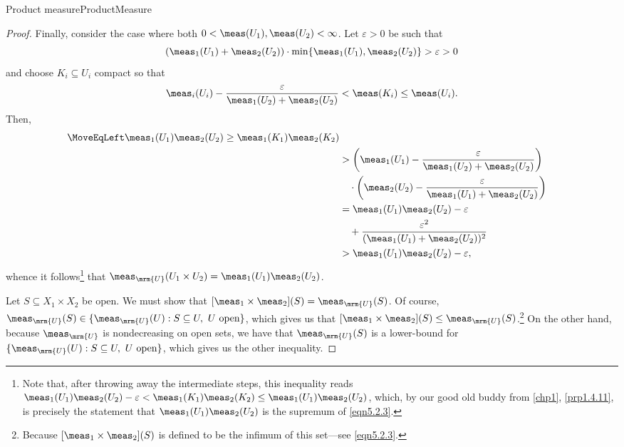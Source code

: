 \begin{thm}{Product measure}{ProductMeasure}
\begin{proof}
Finally, consider the case where both $0<\meas (U_1),\meas (U_2)<\infty$.  Let $\varepsilon >0$ be such that
\begin{equation}
(\meas _1(U_1)+\meas _2(U_2))\cdot \min \{ \meas _1(U_1),\meas _2(U_2)\} >\varepsilon >0
\end{equation}
and choose $K_i\subseteq U_i$ compact so that
\begin{equation}
\meas _i(U_i)-\frac{\varepsilon}{\meas _1(U_2)+\meas _2(U_2)}<\meas (K_i)\leq \meas (U_i).
\end{equation}
Then,
\begin{equation}\label{eqn5.2.16}
\begin{split}
\MoveEqLeft
\meas _1(U_1)\meas _2(U_2)\geq \meas _1(K_1)\meas _2(K_2) \\
& >\left( \meas _1(U_1)-\frac{\varepsilon}{\meas _1(U_2)+\meas _2(U_2)}\right) \\
& \quad \cdot \left( \meas _2(U_2)-\frac{\varepsilon}{\meas _1(U_1)+\meas _2(U_2)}\right) \\
& =\meas _1(U_1)\meas _2(U_2)-\varepsilon \\ & \quad +\frac{\varepsilon ^2}{(\meas _1(U_1)+\meas _2(U_2))^2} \\
& >\meas _1(U_1)\meas _2(U_2)-\varepsilon ,
\end{split}
\end{equation}
whence it follows\footnote{Note that, after throwing away the intermediate steps, this inequality reads $\meas _1(U_1)\meas _2(U_2)-\varepsilon <\meas _1(K_1)\meas _2(K_2)\leq \meas _1(U_1)\meas _2(U_2)$, which, by our good old buddy from \cref{chp1}, \cref{prp1.4.11}, is precisely the statement that $\meas _1(U_1)\meas _2(U_2)$ is the supremum of \eqref{eqn5.2.3}.} that $\meas _{\mrm{U}}(U_1\times U_2)=\meas _1(U_1)\meas _2(U_2)$.

Let $S\subseteq X_1\times X_2$ be open.  We must show that $[\meas _1\times \meas _2](S)=\meas _{\mrm{U}}(S)$.  Of course, $\meas _{\mrm{U}}(S)\in \{ \meas _{\mrm{U}}(U):S\subseteq U,\ U\text{ open}\}$, which gives us that $[\meas _1\times \meas _2](S)\leq \meas _{\mrm{U}}(S)$.\footnote{Because $[\meas _1\times \meas _2](S)$ is defined to be the infimum of this set---see \eqref{eqn5.2.3}.}  On the other hand, because $\meas _{\mrm{U}}$ is nondecreasing on open sets, we have that $\meas _{\mrm{U}}(S)$ is a lower-bound for $\{ \meas _{\mrm{U}}(U):S\subseteq U,\ U\text{ open}\}$, which gives us the other inequality.


\end{proof}
\end{thm}
